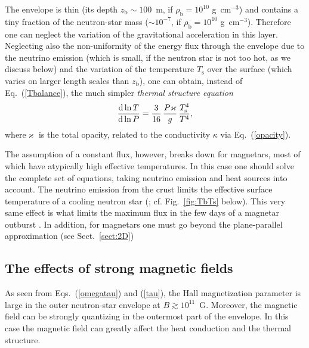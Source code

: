 \documentclass[smallextended]{svjour3}       %
\newcommand{\beq}{\begin{equation}}
\newcommand{\eeq}{\end{equation}}
\newcounter{count}
\newcommand{\gcc}{\mbox{g~cm$^{-3}$}}
\newcommand{\opac}{\varkappa}
\newcommand{\req}[1]{Eq.~(\ref{#1})}
\newcommand{\rhob}{\rho_\mathrm{b}}
\newcommand{\Ts}{T_\mathrm{s}}
\begin{document}
The envelope is thin (its depth $z_\mathrm{b}\sim
100$~m, if $\rhob=10^{10}$ \gcc) and contains a tiny
fraction of the neutron-star mass ($\sim 10^{-7}$, if
$\rhob=10^{10}$ \gcc). Therefore one can neglect the
variation of the gravitational acceleration in this layer.
Neglecting also the non-uniformity of the energy flux through
the envelope due to the neutrino emission (which is small,
if the neutron star is not too hot, as we discuss below) and the 
variation of the temperature $\Ts$ over the surface (which
varies on larger length scales than  $z_\mathrm{b}$), 
one can obtain, instead of \req{Tbalance},
the much simpler \emph{thermal structure
equation} \citep{GPE83,VanRiper88}
\beq
   \frac{{\rm d}\ln T}{{\rm d}\ln P} =
   \frac{3}{ 16}\,\frac{P\opac}{ g}\,\frac{\Ts^4}{ T^4},
\label{th-str}
\eeq
where$\opac$ is the total opacity,
related to the conductivity $\kappa$ via \req{opacity}.

The assumption of a constant flux, however, breaks down for
magnetars, most of which have atypically high effective
temperatures. In this case one should solve the complete set
of equations, taking neutrino emission and heat sources into
account. The neutrino emission from the crust limits the
effective surface temperature of a cooling neutron star
(\citealp{PCY07}; cf.{} Fig.~\ref{fig:TbTs} below).  This
very same effect is what limits the maximum flux in the few
days of a magnetar outburst \citep{PonsRea12}. In addition,
for magnetars one must go beyond the plane-parallel
approximation (see Sect.~\ref{sect:2D})

\subsection{The effects of strong magnetic fields}
\label{sect:env-mag}

As seen from Eqs.~(\ref{omegatau}) and (\ref{tau}), the Hall
magnetization parameter is large in the outer neutron-star
envelope at $B\gtrsim10^{11}$~G. Moreover, the magnetic
field can be strongly quantizing in the outermost part of
the envelope. In this case the magnetic field can greatly
affect the heat conduction  and the thermal structure.
\end{document}
